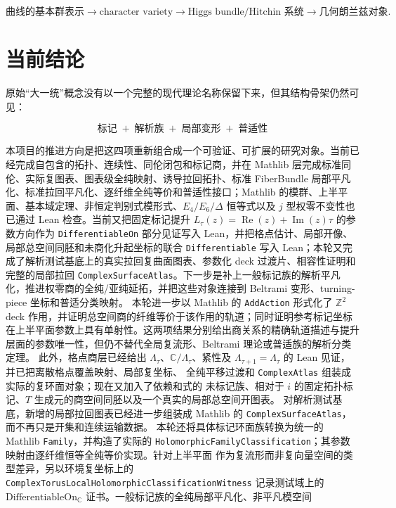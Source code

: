 \documentclass[UTF8,fontset=none,a4paper,11pt]{ctexart}
\begin{document}
\[
  \text{曲线的基本群表示}
  \longrightarrow
  \text{character variety}
  \longrightarrow
  \text{Higgs bundle/Hitchin 系统}
  \longrightarrow
  \text{几何朗兰兹对象}.
\]

\section{当前结论}

原始“大一统”概念没有以一个完整的现代理论名称保留下来，但其结构骨架仍然可见：

\[
\boxed{
\text{标记}\;+\;\text{解析族}\;+\;\text{局部变形}\;+\;\text{普适性}
}
\]

本项目的推进方向是把这四项重新组合成一个可验证、可扩展的研究对象。当前已经完成自包含的拓扑、连续性、同伦闭包和标记商，并在 Mathlib 层完成标准同伦、实际复图表、图表级全纯映射、诱导拉回拓扑、标准 FiberBundle 局部平凡化、标准拉回平凡化、逐纤维全纯等价和普适性接口；Mathlib 的模群、上半平面、基本域定理、非恒定判别式模形式、$E_4/E_6/\Delta$ 恒等式以及 $j$ 型权零不变性也已通过 Lean 检查。当前又把固定标记提升 \(L_\tau(z)=\operatorname{Re}(z)+\operatorname{Im}(z)\tau\) 的参数方向作为 \texttt{DifferentiableOn} 部分见证写入 Lean，并把格点估计、局部开像、局部总空间同胚和未商化升起坐标的联合 \texttt{Differentiable} 写入 Lean；本轮又完成了解析测试基底上的真实拉回复曲面图表、参数化 deck 过渡片、相容性证明和完整的局部拉回 \texttt{ComplexSurfaceAtlas}。下一步是补上一般标记族的解析平凡化，推进权零商的全纯/亚纯延拓，并把这些对象连接到 Beltrami 变形、turning-piece 坐标和普适分类映射。
本轮进一步以 Mathlib 的 \texttt{AddAction} 形式化了 \(\mathbb Z^2\) deck 作用，并证明总空间商的纤维等价于该作用的轨道；同时证明参考标记坐标在上半平面参数上具有单射性。这两项结果分别给出商关系的精确轨道描述与提升层面的参数唯一性，但仍不替代全局复流形、Beltrami 理论或普适族的解析分类定理。
此外，格点商层已经给出 $\Lambda_\tau$、$\mathbb C/\Lambda_\tau$、紧性及
$\Lambda_{\tau+1}=\Lambda_\tau$ 的 Lean 见证，并已把离散格点覆盖映射、局部复坐标、
全纯平移过渡和 \texttt{ComplexAtlas} 组装成实际的复环面对象；现在又加入了依赖和式的
未标记族、相对于 $i$ 的固定拓扑标记、$T$ 生成元的商空间同胚以及一个真实的局部总空间开图表。
对解析测试基底，新增的局部拉回图表已经进一步组装成 Mathlib 的
\texttt{ComplexSurfaceAtlas}，而不再只是开集和连续运输数据。
本轮还将具体标记环面族转换为统一的 Mathlib \texttt{Family}，并构造了实际的
\texttt{HolomorphicFamilyClassification}；其参数映射由逐纤维恒等全纯等价实现。针对上半平面
作为复流形而非复向量空间的类型差异，另以环境复坐标上的
\texttt{ComplexTorusLocalHolomorphicClassificationWitness} 记录测试域上的
\(\mathrm{DifferentiableOn}_{\mathbb C}\) 证书。一般标记族的全纯局部平凡化、非平凡模空间
\end{document}
